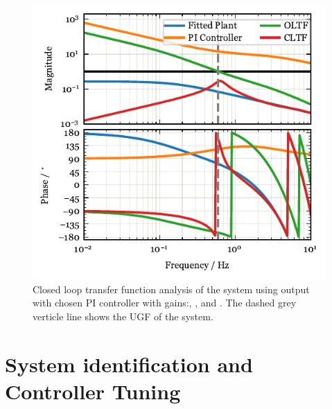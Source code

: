 \begin{figure}[!ht]
 \centering
 \includegraphics[width=\linewidth]{figures/Afrac_LoopStability.pdf}
 \caption{Closed loop transfer function analysis of the system  using \Afrac output with chosen PI controller with gains:\AfracKp, \AfracTi, and \Afracstau.
The dashed grey verticle line shows the \ac{UGF} of the system.}
\label{fig:cltf_afrac}
\end{figure}

\section{System identification and Controller Tuning}
\label{sec:sysid}

